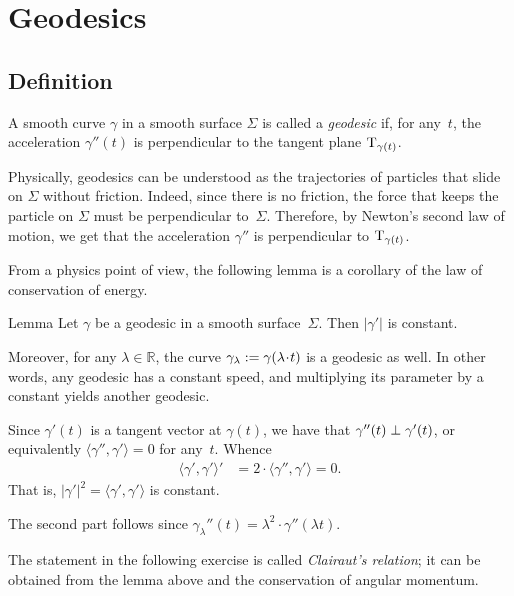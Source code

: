 \chapter{Geodesics}
\label{chap:geodesics}


\section{Definition}

A smooth curve $\gamma$ in a smooth surface $\Sigma$ is called a \emph{geodesic} if, for any~$t$, the acceleration $\gamma''(t)$ is perpendicular to the tangent plane $\mathrm{T}_{\gamma(t)}$.

Physically, geodesics can be understood as the trajectories of particles that slide on $\Sigma$ without friction.
Indeed, since there is no friction, the force that keeps the particle on $\Sigma$ must be perpendicular to~$\Sigma$.
Therefore, by Newton's second law of motion,
we get that the acceleration $\gamma''$ is perpendicular to $\mathrm{T}_{\gamma(t)}$.

From a physics point of view, the following lemma is a corollary of the law of conservation of energy.


\begin{thm}{Lemma}\label{lem:constant-speed}
Let $\gamma$ be a geodesic in a smooth surface~$\Sigma$. 
Then $|\gamma'|$ is constant.

Moreover, for any $\lambda\in\mathbb{R}$, the curve 
$\gamma_{\lambda}\df \gamma (\lambda\cdot t)$ is a geodesic as well. 
In other words, any geodesic has a constant speed, and multiplying its parameter by a constant yields another geodesic.
\end{thm}


Since $\gamma'(t)$ is a tangent vector at $\gamma(t)$,
we have that $\gamma''(t)\z\perp\gamma'(t)$, or equivalently $\langle\gamma'',\gamma'\rangle=0$ for any~$t$.
Whence 
\begin{align*}
\langle\gamma',\gamma'\rangle'&=2\cdot \langle\gamma'',\gamma'\rangle=0.
\end{align*}
That is, $|\gamma'|^2=\langle\gamma',\gamma'\rangle$ is constant.

The second part follows since 
$\gamma_{\lambda}''(t) =\lambda^2\cdot \gamma''(\lambda t)$.
\qeds


The statement in the following exercise is called \emph{Clairaut's relation};
it can be obtained from the lemma above and the conservation of angular momentum.

